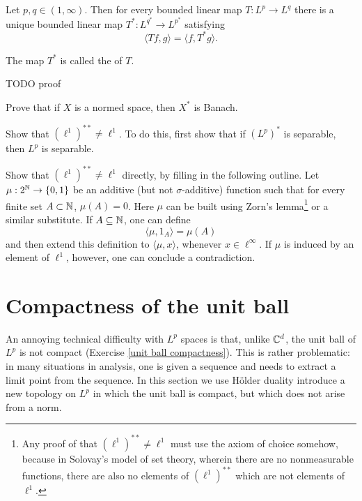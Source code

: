 \begin{theorem}
Let $p, q \in (1, \infty)$. Then for every bounded linear map $T: L^p \to L^q$ there is a unique bounded linear map $T^*: L^{q^*} \to L^{p^*}$ satisfying
\[\langle Tf, g\rangle = \langle f, T^*g\rangle.\]
\end{theorem}
\begin{definition}
The map $T^*$ is called the  of $T$.
\end{definition}
TODO proof





\begin{exercise}
\label{dual space is banach}
Prove that if $X$ is a normed space, then $X^*$ is Banach.
\end{exercise}

\begin{exercise}
Show that $(\ell^1)^{**} \neq \ell^1$.
To do this, first show that if $(L^p)^*$ is separable, then $L^p$ is separable.
\end{exercise}

\begin{exercise}
Show that $(\ell^1)^{**} \neq \ell^1$ directly, by filling in the following outline.
Let $\mu: 2^{\mathbb{N}} \to \{0, 1\}$ be an additive (but not $\sigma$-additive) function such that for every finite set $A \subset \mathbb{N}$, $\mu(A) = 0$.
Here $\mu$ can be built using Zorn's lemma\footnote{Any proof of that $(\ell^1)^{**} \neq \ell^1$ must use the axiom of choice somehow, because in Solovay's model of set theory, wherein there are no nonmeasurable functions, there are also no elements of $(\ell^1)^{**}$ which are not elements of $\ell^1$.} or a similar substitute.
If $A \subseteq \mathbb{N}$, one can define
\[\langle \mu, 1_A\rangle = \mu(A)\]
and then extend this definition to $\langle \mu, x\rangle$, whenever $x \in \ell^\infty$.
If $\mu$ is induced by an element of $\ell^1$, however, one can conclude a contradiction.
\end{exercise}

\section{Compactness of the unit ball}
An annoying technical difficulty with $L^p$ spaces is that, unlike $\mathbb{C}^d$, the unit ball of $L^p$ is not compact (Exercise \ref{unit ball compactness}).
This is rather problematic: in many situations in analysis, one is given a sequence and needs to extract a limit point from the sequence.
In this section we use H\"older duality introduce a new topology on $L^p$ in which the unit ball is compact, but which does not arise from a norm.

